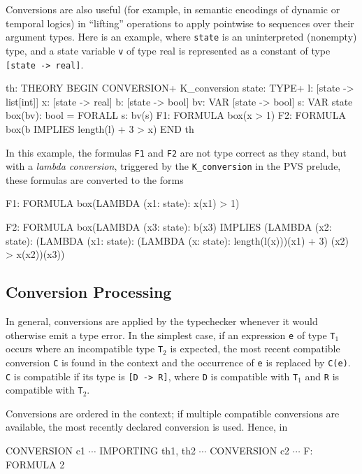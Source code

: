 Conversions are also useful (for example, in semantic encodings of dynamic
or temporal logics) in ``lifting'' operations to apply pointwise to
sequences over their argument types.  Here is an example, where
\texttt{state} is an uninterpreted (nonempty) type, and a state variable
\texttt{v} of type real is represented as a constant of type
\texttt{[state -> real]}.
\begin{session}
  th: THEORY
   BEGIN
    CONVERSION+ K_conversion
    state: TYPE+
    l: [state -> list[int]]
    x: [state -> real]
    b: [state -> bool]
    bv: VAR [state -> bool]
    s: VAR state
    box(bv): bool = FORALL s: bv(s)
    F1: FORMULA box(x > 1)
    F2: FORMULA box(b IMPLIES length(l) + 3 > x)
   END th
\end{session}
In this example, the formulas \texttt{F1} and \texttt{F2} are not type
correct as they stand, but with a \emph{lambda conversion}, triggered by the
\texttt{K\_conversion} in the PVS prelude, these formulas are converted to
the forms
\begin{session}
  F1: FORMULA box(LAMBDA (x1: state): x(x1) > 1)
  
  F2: FORMULA
    box(LAMBDA (x3: state):
          b(x3) IMPLIES
           (LAMBDA (x2: state):
              (LAMBDA (x1: state):
                 (LAMBDA (x: state): length(l(x)))(x1) + 3)
                (x2)
             > x(x2))(x3))
\end{session}


\subsection{Conversion Processing}

In general, conversions are applied by the typechecker whenever it would
otherwise emit a type error.  In the simplest case, if an expression
\texttt{e} of type \texttt{T$_1$} occurs where an incompatible type
\texttt{T$_2$} is expected, the most recent compatible conversion
\texttt{C} is found in the context and the occurrence of \texttt{e} is
replaced by \texttt{C(e)}.  \texttt{C} is compatible if its type is
\texttt{[D -> R]}, where \texttt{D} is compatible with \texttt{T$_1$} and
\texttt{R} is compatible with \texttt{T$_2$}.

Conversions are ordered in the context; if multiple compatible conversions
are available,  the most recently declared conversion is used.  Hence, in

\begin{pvsex}
  CONVERSION c1
  \(\cdots\)
  IMPORTING th1, th2
  \(\cdots\)
  CONVERSION c2
  \(\cdots\)
  F: FORMULA 2
\end{pvsex}

